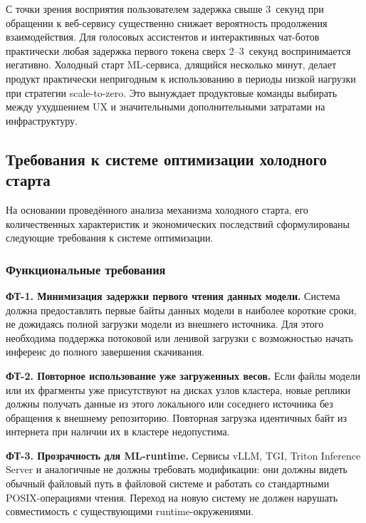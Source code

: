 С точки зрения восприятия пользователем задержка свыше 3~секунд при обращении к веб-сервису существенно снижает вероятность продолжения взаимодействия. Для голосовых ассистентов и интерактивных чат-ботов практически любая задержка первого токена сверх 2--3~секунд воспринимается негативно. Холодный старт ML-сервиса, длящийся несколько минут, делает продукт практически непригодным к использованию в периоды низкой нагрузки при стратегии scale-to-zero. Это вынуждает продуктовые команды выбирать между ухудшением UX и значительными дополнительными затратами на инфраструктуру.

\subsection{Требования к системе оптимизации холодного старта}

На основании проведённого анализа механизма холодного старта, его количественных характеристик и экономических последствий сформулированы следующие требования к системе оптимизации.

\subsubsection{Функциональные требования}

\textbf{ФТ-1. Минимизация задержки первого чтения данных модели.} Система должна предоставлять первые байты данных модели в наиболее короткие сроки, не дожидаясь полной загрузки модели из внешнего источника. Для этого необходима поддержка потоковой или ленивой загрузки с возможностью начать инференс до полного завершения скачивания.

\textbf{ФТ-2. Повторное использование уже загруженных весов.} Если файлы модели или их фрагменты уже присутствуют на дисках узлов кластера, новые реплики должны получать данные из этого локального или соседнего источника без обращения к внешнему репозиторию. Повторная загрузка идентичных байт из интернета при наличии их в кластере недопустима.

\textbf{ФТ-3. Прозрачность для ML-runtime.} Сервисы vLLM, TGI, Triton Inference Server и аналогичные не должны требовать модификации: они должны видеть обычный файловый путь в файловой системе и работать со стандартными POSIX-операциями чтения. Переход на новую систему не должен нарушать совместимость с существующими runtime-окружениями.

